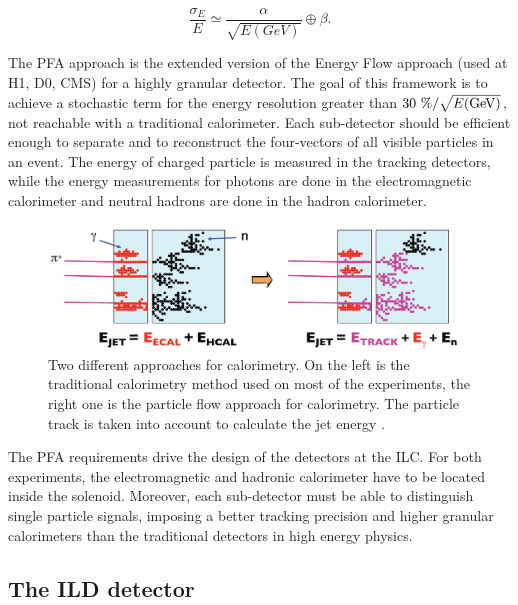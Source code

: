     \begin{equation}
      \frac{\sigma_E}{E} \simeq \frac{\alpha}{\sqrt{E(GeV)}} \oplus \beta.
      \label{eq:jet}
    \end{equation}

    The \gls{PFA} approach is the extended version of the Energy Flow approach (used at H1, D0, CMS) for a highly granular detector. 
    The goal of this framework is to achieve a stochastic term for the energy resolution greater than $30~\% / \sqrt{E\rm{(GeV)}}$, not reachable with a traditional calorimeter.
    Each sub-detector should be efficient enough to separate and to reconstruct the four-vectors of all visible particles in an event.
    The energy of charged particle is measured in the tracking detectors, while the energy measurements for photons are done in the electromagnetic calorimeter and neutral hadrons are done in the hadron calorimeter.
     
     \begin{figure}[!h]
      \centering
      \includegraphics[width = 15cm]{Pictures/ILC/physics.jpg}
      \caption{Two different approaches for calorimetry. On the left is the traditional calorimetry method used on most of the experiments, the right one is the particle flow approach for calorimetry. The particle track is taken into account to calculate the jet energy \cite{PFA}.}
      \label{fig:jetEnergy}
    \end{figure}   
    
    The \gls{PFA} requirements drive the design of the detectors at the ILC.
    For both experiments, the electromagnetic and hadronic calorimeter have to be located inside the solenoid.
    Moreover, each sub-detector must be able to distinguish single particle signals, imposing a better tracking precision and higher granular calorimeters than the traditional detectors in high energy physics.

    \subsection{The ILD detector}
    \label{sec:ILD}
    
